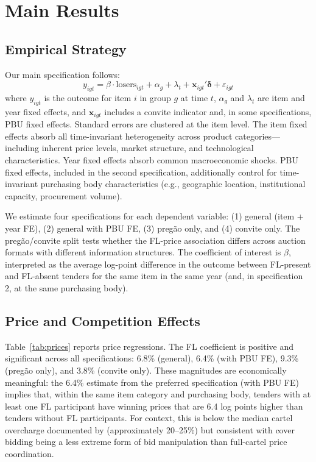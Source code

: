 \section{Main Results}
\label{sec:results}

\subsection{Empirical Strategy}

Our main specification follows:
\begin{equation}
y_{igt} = \beta \cdot \text{losers}_{igt} + \alpha_g + \lambda_t + \mathbf{x}_{igt}'\boldsymbol{\delta} + \varepsilon_{igt}
\label{eq:main}
\end{equation}
where $y_{igt}$ is the outcome for item $i$ in group $g$ at time $t$, $\alpha_g$ and $\lambda_t$ are item and year fixed effects, and $\mathbf{x}_{igt}$ includes a convite indicator and, in some specifications, PBU fixed effects. Standard errors are clustered at the item level. The item fixed effects absorb all time-invariant heterogeneity across product categories---including inherent price levels, market structure, and technological characteristics. Year fixed effects absorb common macroeconomic shocks. PBU fixed effects, included in the second specification, additionally control for time-invariant purchasing body characteristics (e.g., geographic location, institutional capacity, procurement volume).

We estimate four specifications for each dependent variable: (1) general (item + year FE), (2) general with PBU FE, (3) preg\~{a}o only, and (4) convite only. The preg\~{a}o/convite split tests whether the FL-price association differs across auction formats with different information structures. The coefficient of interest is $\beta$, interpreted as the average log-point difference in the outcome between FL-present and FL-absent tenders for the same item in the same year (and, in specification 2, at the same purchasing body).

\subsection{Price and Competition Effects}

Table~\ref{tab:prices} reports price regressions. The FL coefficient is positive and significant across all specifications: 6.8\% (general), 6.4\% (with PBU FE), 9.3\% (preg\~{a}o only), and 3.8\% (convite only). These magnitudes are economically meaningful: the 6.4\% estimate from the preferred specification (with PBU FE) implies that, within the same item category and purchasing body, tenders with at least one FL participant have winning prices that are 6.4 log points higher than tenders without FL participants. For context, this is below the median cartel overcharge documented by \citet{connor2007price} (approximately 20--25\%) but consistent with cover bidding being a less extreme form of bid manipulation than full-cartel price coordination.

